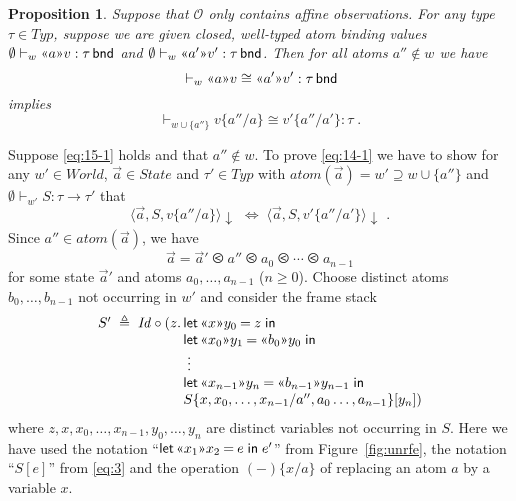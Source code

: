 \documentclass{LMCS}
\theoremstyle{plain}
\newtheorem{proposition}[thm]{Proposition}
\theoremstyle{definition}
\newcommand{\atm}[1][a]{#1}
\newcommand{\atoms}{\mathit{atom}}
\newcommand{\bimp}{\Leftrightarrow}
\newcommand{\BINDTY}{\kw{bnd}}
\newcommand{\BINDVAL}[2]{\mathopen{\text{\normalfont\guillemotleft}}#1
  \mathclose{\text{\normalfont\guillemotright}}#2}
\newcommand{\comp}{\circ}
\newcommand{\config}[3]{\langle#1, #2, #3\rangle}
\newcommand{\defeq}{\triangleq}
\newcommand{\ent}{\vdash}
\newcommand{\EQ}{\mathbin{\kw{=}}}
\newcommand{\es}{\mathit{Id}}
\renewcommand{\exp}[1][e]{#1}
\newcommand{\FUNTY}{\mathbin{\rightarrow}}
\newcommand{\IN}{\mathrel{\kw{in}}}
\newcommand{\LET}{\mathop{\kw{let}}}
\newcommand{\LP}{\mathopen{\kw{(}}}
\newcommand{\kw}[1]{\mathsf{#1}}
\newcommand{\Obs}{\mathcal{O}}
\newcommand{\ofty}{:}
\newcommand{\opeq}{\cong}
\newcommand{\ords}{\olessthan}\newcommand{\PAIR}[2]{\LP#1\mathbin{\kw{,}}#2\RP}
\newcommand{\rename}[2]{\{#2/#1\}}
\newcommand{\RP}{\mathclose{\kw{)}}}
\newcommand{\State}{\mathit{State}}
\newcommand{\s}[1][a]{\vec{#1}}
\newcommand{\stk}[1][S]{#1}
\newcommand{\terminates}[1][]{{\downarrow_{#1}}}
\newcommand{\ty}{\tau}
\newcommand{\Ty}{\mathit{Typ}}
\newcommand{\val}[1][v]{#1}
\newcommand{\vid}[1][x]{#1}
\newcommand{\w}[1][w]{#1}
\newcommand{\World}{\mathit{World}}
\begin{document}
\begin{proposition}
  \label{prop:ext-bind-2}
  Suppose that $\Obs$ only contains affine observations.  For any type
  $\ty\in\Ty$, suppose we are given closed, well-typed atom binding
  values $\emptyset\ent_{\w}\BINDVAL{\atm}{\val}\ofty\ty\,\BINDTY$ and
  $\emptyset\ent_{\w}\BINDVAL{\atm'}{\val'}\ofty\ty\,\BINDTY$. Then
  for all atoms $\atm''\notin\w$ we have
  \begin{equation}
    \label{eq:15-1}
    {}\ent_{\w}\BINDVAL{\atm}{\val} \opeq \BINDVAL{\atm'}{\val'}
    \ofty\ty\,\BINDTY
  \end{equation}
  implies
  \begin{equation}
    \label{eq:14-1}
    {}\ent_{\w\cup\{\atm''\}}\val\rename{\atm}{\atm''} \opeq
    \val'\rename{\atm'}{\atm''} \ofty \ty\;.
  \end{equation}
\end{proposition}
\proof
  Suppose \eqref{eq:15-1} holds and that $\atm''\notin\w$. To prove
  \eqref{eq:14-1} we have to show for any $\w'\in\World$,
  $\s\in\State$ and $\ty'\in\Ty$ with
  $\atoms(\s)=\w'\supseteq\w\cup\{a''\}$ and
  $\emptyset\ent_{\w'}\stk\ofty\ty\FUNTY\ty'$ that
  \begin{equation}  
    \label{eq:17}
    \config{\s}{\stk}{\val\rename{\atm}{\atm''}}\terminates \;\bimp\;
    \config{\s}{\stk}{\val'\rename{\atm'}{\atm''}}\terminates\;.
  \end{equation}
  Since $a''\in \atoms(\s)$, we have
  \begin{equation}
    \label{eq:18}
    \s = \s'\ords \atm''\ords \atm_0\ords\cdots\ords \atm_{n-1}
  \end{equation}
  for some state $\s'$ and atoms $\atm_0,\ldots,\atm_{n-1}$ ($n\geq
  0$).  Choose distinct atoms $\atm[b]_0,\ldots,\atm[b]_{n-1}$ not
  occurring in $\w'$ and consider the frame stack
  \begin{equation}
    \label{eq:20}
    \begin{array}{l@{}l}
      \stk' \;\defeq\; 
      \es\comp (\vid[z].\, &\LET {\BINDVAL{\vid}{\vid[y]_0}\EQ \vid[z]} \IN\\
      &\LET {\BINDVAL{\vid_0}{\vid[y]_1}\EQ\BINDVAL{\atm[b]_0}{\vid[y]_0}} \IN\\
      &\;\vdots\\
      &\LET {\BINDVAL{\vid_{n-1}}{\vid[y]_n}\EQ
        \BINDVAL{\atm[b]_{n-1}}{\vid[y]_{n-1}}} \IN{}\\
      &\stk\rename{\atm'',\atm_0\ldots,\atm_{n-1}}{\vid,\vid_0,\ldots,\vid_{n-1}}[\vid[y]_n])
    \end{array}
  \end{equation}
  where
  $\vid[z],\vid,\vid_0,\ldots,\vid_{n-1},\vid[y]_0,\ldots,\vid[y]_n$
  are distinct variables not occurring in $\stk$. Here we have used
  the notation ``$\LET {\BINDVAL{\vid_1}{\vid_2}\EQ\exp} \IN \exp' $''
  from Figure~\ref{fig:unrfe}, the notation ``$\stk{[\exp]}$'' from
  \eqref{eq:3} and the operation $(-)\rename{\atm}{\vid}$ of replacing
  an atom $\atm$ by a variable $\vid$.
\end{document}
